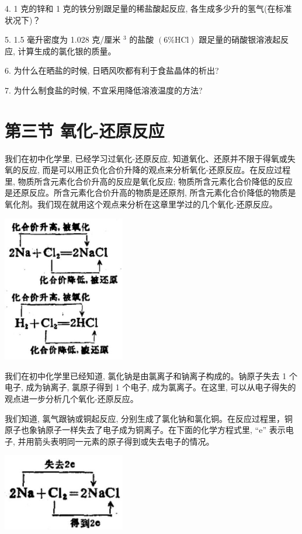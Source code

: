 \documentclass[10pt]{article}
\begin{document}
4. 1 克的锌和 1 克的铁分别跟足量的稀盐酸起反应, 各生成多少升的氢气(在标准状况下)？

5. 1.5 毫升密度为 1.028 克/厘米 \({}^{3}\) 的盐酸 \(\left( {6\% \mathrm{{HCl}}}\right)\) 跟足量的硝酸银溶液起反应, 计算生成的氯化银的质量。

6. 为什么在晒盐的时候, 日晒风吹都有利于食盐晶体的析出?

7. 为什么制食盐的时候, 不宜采用降低溶液温度的方法?

\section*{第三节 氧化-还原反应}

我们在初中化学里, 已经学习过氧化-还原反应, 知道氧化、还原并不限于得氧或失氧的反应, 而是可以用正负化合价升降的观点来分析氧化-还原反应。在反应过程里, 物质所含元素化合价升高的反应是氧化反应; 物质所含元素化合价降低的反应是还原反应。所含元素化合价升高的物质是还原剂, 所含元素化合价降低的物质是氧化剂。我们现在就用这个观点来分析在这章里学过的几个氧化-还原反应。

\begin{center}
\includegraphics[max width=0.4\textwidth]{images/01912d0f-097c-7e75-8f32-4f326cd86c9f_42_511225.jpg}
\end{center}

我们在初中化学里已经知道, 氯化钠是由氯离子和钠离子构成的。钠原子失去 1 个电子, 成为钠离子, 氯原子得到 1 个电子, 成为氯离子。在这里, 可以从电子得失的观点进一步分析几个氧化-还原反应。

我们知道, 氯气跟钠或铜起反应, 分别生成了氯化钠和氯化铜。在反应过程里，铜原子也象钠原子一样失去了电子成为铜离子。在下面的化学方程式里, “e” 表示电子, 并用箭头表明同一元素的原子得到或失去电子的情况。

\begin{center}
\includegraphics[max width=0.4\textwidth]{images/01912d0f-097c-7e75-8f32-4f326cd86c9f_43_984832.jpg}
\end{center}
\end{document}

